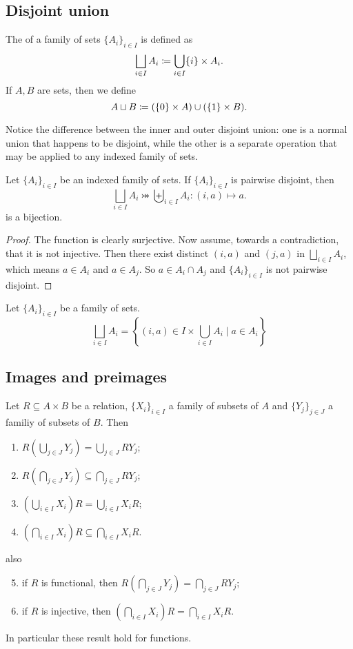\subsection{Disjoint union}
\begin{definition}
The  of a family of sets $\{A_i\}_{i\in I}$ is defined as
\[ \bigsqcup_{i\in I}A_i \coloneqq \bigcup_{i\in I}\{i\}\times A_i. \]
If $A,B$ are sets, then we define
\[ A\sqcup B \coloneqq (\{0\}\times A)\cup (\{1\}\times B). \]
\end{definition}

Notice the difference between the inner and outer disjoint union: one is a normal union that happens to be disjoint, while the other is a separate operation that may be applied to any indexed family of sets.

\begin{lemma}
Let $\{A_i\}_{i\in I}$ be an indexed family of sets. If $\{A_i\}_{i\in I}$ is pairwise disjoint, then
\[ \bigsqcup_{i\in I}A_i \twoheadrightarrowtail \biguplus_{i\in I}A_i: (i, a) \mapsto a. \]
is a bijection.
\end{lemma}
\begin{proof}
The function is clearly surjective. Now assume, towards a contradiction, that it is not injective. Then there exist distinct $(i,a)$ and $(j,a)$ in $\bigsqcup_{i\in I}A_i$, which means $a\in A_i$ and $a\in A_j$. So $a\in A_i\cap A_j$ and $\{A_i\}_{i\in I}$ is not pairwise disjoint.
\end{proof}

\begin{lemma}
Let $\{A_i\}_{i\in I}$ be a family of sets.
\[ \bigsqcup_{i\in I}A_i = \left\{ (i,a)\in I\times \bigcup_{i\in I}A_i \;|\; a\in A_i \right\} \]
\end{lemma}

\subsection{Images and preimages}
\begin{lemma}
Let $R \subseteq A\times B$ be a relation, $\{X_i\}_{i\in I}$ a family of subsets of $A$ and $\{Y_j\}_{j\in J}$ a familiy of subsets of $B$. Then
\begin{enumerate}
\item $R\left(\bigcup_{j\in J} Y_j\right) = \bigcup_{j\in J} RY_j$;
\item $R\left(\bigcap_{j\in J} Y_j\right) \subseteq \bigcap_{j\in J} RY_j$;
\item $\left(\bigcup_{i\in I} X_i\right)R = \bigcup_{i\in I} X_iR$;
\item $\left(\bigcap_{i\in I} X_i\right)R \subseteq \bigcap_{i\in I} X_iR$.
\end{enumerate}
also
\begin{enumerate} \setcounter{enumi}{4}
\item if $R$ is functional, then $R\left(\bigcap_{j\in J} Y_j\right) = \bigcap_{j\in J} RY_j$;
\item if $R$ is injective, then $\left(\bigcap_{i\in I} X_i\right)R = \bigcap_{i\in I} X_iR$.
\end{enumerate}
\end{lemma}
In particular these result hold for functions.
